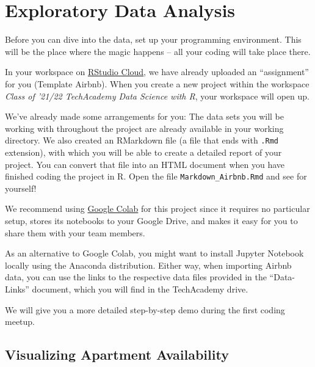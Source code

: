 \documentclass[
  11pt,
]{article}
\newenvironment{tips}[1]
  {
  \begin{itemize}
  \footnotesize
  \renewcommand{\labelitemi}{
    \raisebox{-.7\height}[0pt][0pt]{
      {\setkeys{Gin}{width=3em,keepaspectratio}
        \texttt{[image: images/\#1.png]}}
    }
  }
  \setlength{\fboxsep}{1em}
  \begin{rbox}
  \item
  }
  {
  \end{rbox}
  \end{itemize}
  }
\newenvironment{tipsp}[1]
  {
  \begin{itemize}
  \footnotesize
  \renewcommand{\labelitemi}{
    \raisebox{-.7\height}[0pt][0pt]{
      {\setkeys{Gin}{width=3em,keepaspectratio}
        \texttt{[image: images/\#1.png]}}
    }
  }
  \setlength{\fboxsep}{1em}
  \begin{pbox}
  \item
  }
  {
  \end{pbox}
  \end{itemize}
  }
\begin{document}
\newpage

\hypertarget{exploratory-data-analysis}{%
\section{Exploratory Data Analysis}\label{exploratory-data-analysis}}

Before you can dive into the data, set up your programming environment.
This will be the place where the magic happens -- all your coding will take place there.

\begin{tips}r
In your workspace on \href{https://rstudio.cloud/projects}{RStudio Cloud}, we have already uploaded an ``assignment'' for you (Template Airbnb).
When you create a new project within the workspace \emph{Class of '21/22 \textbar{} TechAcademy \textbar{} Data Science with R}, your workspace will open up.

We've already made some arrangements for you: The data sets you will be working with throughout the project are already available in your working directory.
We also created an RMarkdown file (a file that ends with \texttt{.Rmd} extension), with which you will be able to create a detailed report of your project.
You can convert that file into an HTML document when you have finished coding the project in R.
Open the file \texttt{Markdown\_Airbnb.Rmd} and see for yourself!

\end{tips}

\begin{tipsp}p
We recommend using \href{https://colab.research.google.com}{Google Colab} for this project since it requires no particular setup, stores its notebooks to your Google Drive, and makes it easy for you to share them with your team members.

As an alternative to Google Colab, you might want to install Jupyter Notebook locally using the Anaconda distribution.
Either way, when importing Airbnb data, you can use the links to the respective data files provided in the ``Data-Links'' document, which you will find in the TechAcademy drive.

We will give you a more detailed step-by-step demo during the first coding meetup.

\end{tipsp}

\hypertarget{visualizing-apartment-availability}{%
\subsection{Visualizing Apartment Availability}\label{visualizing-apartment-availability}}
\end{document}

